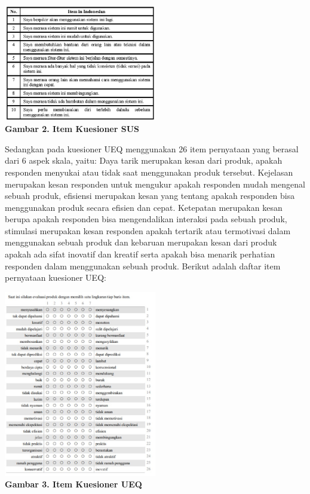 \documentclass[
 manuscript=article,  %
  layout=publish, 
  year=2024, 
  month= Februari, %
  volume=8,
  number=1 
]{JIKO}
\begin{document}
\begin{center}
    \includegraphics[width=0.5\textwidth]{assets/gambar2.jpg}
    \\\textbf{Gambar 2. Item Kuesioner SUS}
\end{center}

Sedangkan pada kuesioner UEQ menggunakan 26 item pernyataan yang berasal dari 6 aspek skala, yaitu: Daya tarik merupakan kesan dari produk, apakah responden menyukai atau tidak saat menggunakan produk tersebut. Kejelasan merupakan kesan responden untuk mengukur apakah responden mudah mengenal sebuah produk, efisiensi merupakan kesan yang tentang apakah responden bisa menggunakan produk secara efisien dan cepat. Ketepatan merupakan kesan berupa apakah responden bisa mengendalikan interaksi pada sebuah produk, stimulasi merupakan kesan responden apakah tertarik atau termotivasi dalam menggunakan sebuah produk dan kebaruan merupakan kesan dari produk apakah ada sifat inovatif dan kreatif serta apakah bisa menarik perhatian responden dalam menggunakan sebuah produk. Berikut adalah daftar item pernyataan kuesioner UEQ: 

\begin{center}
    \includegraphics[width=0.5\textwidth]{assets/gambar3.jpg}
    \\\textbf{Gambar 3. Item Kuesioner UEQ}
\end{center}
\end{document}
